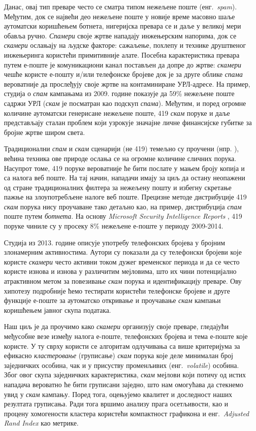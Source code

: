 \documentclass[a4paper]{article}
\begin{document}
Данас, овај тип преваре често се сматра типом нежељене поште (енг.~{\em spam}). Међутим, док се највећи део нежељене поште у новије време масовно шаље аутоматски коришћењем ботнета, нигеријска превара се и даље у великој мери обавља ручно. \emph{Спамери} своје жртве нападају инжењерским напорима, док се \emph{скамери} ослањају на људске факторе: сажаљење, похлепу и технике друштвеног инжењеринга користећи примитивније алате. Посебна карактеристика превара путем е-поште је комуникациони канал постављен да допре до жртве: \emph{скамери} чешће користе е-пошту и/или телефонске бројеве \cite{phone} док је за друге облике \emph{спама} вероватније да прослеђују своје жртве на контаминиране УРЛ-адресе. На пример, студија о \emph{спам} кампањама из 2009. године \cite{study} показује да 59\% нежељене поште садржи УРЛ (\emph{скам} је посматран као подскуп \emph{спама}). Међутим, и поред огромне количине аутоматски генерисане нежељене поште, 419 \emph{скам} поруке и даље представљају сталан проблем који узрокује значајне личне финансијске губитке за бројне жртве широм света.

Традиционални \emph{спам} и \emph{скам} сценарији (не 419) темељно су проучени (нпр. \cite{study,cishi}), већина техника ове природе ослања се на огромне количине сличних порука. Насупрот томе, 419 поруке вероватније ће бити послате у мањем броју копија и са налога веб поште. На тај начин, нападачи имају за циљ да остану неопажени од стране традиционалних филтера за нежељену пошту и избегну скретање пажње на злоупотребљене налоге веб поште. Прецизне методе дистрибуције 419 \emph{скам} порука нису проучаване тако детаљно као, на пример, дистрибуција \emph{спам} поште путем \emph{ботнета}. На основу {\em Microsoft Security Intelligence Reports} \cite{microsoft}, 419 поруке чиниле су у просеку 8\% нежељене е-поште у периоду 2009-2014.

Студија из 2013. године \cite{phone} описује употребу телефонских бројева у бројним злонамерним активностима. Аутори су показали да су телефонски бројеви које користе \emph{скамери} често активни током дужег временског периода и да се често користе изнова и изнова у различитим мејловима, што их чини потенцијално атрактивном метом за повезивање \emph{скам} порука и идентификацију преваре. Ову хипотезу подробније ћемо тестирати користећи телефонске бројеве и друге функције е-поште за аутоматско откривање и проучавање \emph{скам} кампањи коришћењем јавног скупа података.

Наш циљ је да проучимо како \emph{скамери} организују своје преваре, гледајући међусобне везе између налога е-поште, телефонских бројева и тема е-поште које користе. У ту сврху користи се алгоритам одлучивања са више критеријума за ефикасно \emph{кластеровање} (груписање) \emph{скам} порука које деле минималан број заједничких особина, чак и у присуству променљивих (енг.~{\em volatile}) особина. Због овог скупа заједничких карактеристика, \emph{скам} мејлови који потичу од истих нападача вероватно ће бити груписани заједно, што нам омогућава да стекнемо увид у \emph{скам} кампању. Поред тога, оцењујемо квалитет и доследност наших резултата груписања. Ради тога вршимо анализу прага осетљивости, као и процену хомогености кластера користећи компактност графикона и енг.~{\em Adjusted Rand Index} као метрике.
\end{document}

